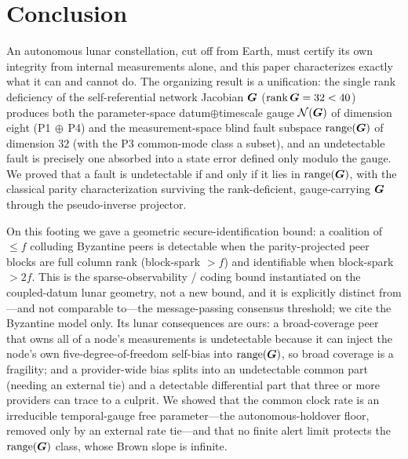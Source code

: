 \section{Conclusion}
\label{sec:conclusion}

An autonomous lunar constellation, cut off from Earth, must certify its own integrity from
internal measurements alone, and this paper characterizes exactly what it can and cannot do.
The organizing result is a unification: the single rank deficiency of the self-referential
network Jacobian $\bm{G}$ ($\operatorname{rank}\bm{G}=32<40$) produces both the parameter-space
datum$\oplus$timescale gauge $\mathcal{N}(\bm{G})$ of dimension eight (P1$\,\oplus\,$P4) and the
measurement-space blind fault subspace $\operatorname{range}(\bm{G})$ of dimension $32$ (with the P3
common-mode class a subset), and an undetectable fault is precisely one absorbed into a state
error defined only modulo the gauge. We proved that a fault is undetectable if and only if it
lies in $\operatorname{range}(\bm{G})$, with the classical parity characterization surviving the
rank-deficient, gauge-carrying $\bm{G}$ through the pseudo-inverse projector.

On this footing we gave a geometric secure-identification bound: a coalition of $\le f$
colluding Byzantine peers is detectable when the parity-projected peer blocks are full column
rank (block-spark $>f$) and identifiable when block-spark $>2f$. This is the
sparse-observability / coding bound instantiated on the coupled-datum lunar geometry, not a
new bound, and it is explicitly distinct from---and not comparable to---the message-passing
consensus threshold; we cite the Byzantine model only. Its lunar consequences are ours: a
broad-coverage peer that owns all of a node's measurements is undetectable because it can
inject the node's own five-degree-of-freedom self-bias into $\operatorname{range}(\bm{G})$, so broad coverage
is a fragility; and a provider-wide bias splits into an undetectable common part (needing an
external tie) and a detectable differential part that three or more providers can trace to a
culprit. We showed that the common clock rate is an irreducible temporal-gauge free
parameter---the autonomous-holdover floor, removed only by an external rate tie---and that no
finite alert limit protects the $\operatorname{range}(\bm{G})$ class, whose Brown slope is infinite.

